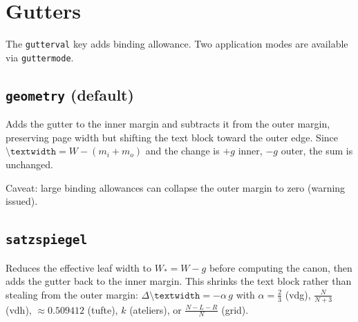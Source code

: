 \documentclass[11pt, twoside, openany]{book}
\newcommand{\cmd}[1]{\texttt{\textbackslash #1}}
\begin{document}
\chapter{Gutters}\label{chapter:gutters}

The \texttt{gutterval} key adds binding allowance. Two application modes are available via \texttt{guttermode}.

\section{\texttt{geometry} (default)}\label{sec:guttergeometry}

Adds the gutter to the inner margin and subtracts it from the outer margin, preserving page width but shifting the text block toward the outer edge. Since $\cmd{textwidth} = W - (m_i + m_o)$ and the change is $+g$ inner, $-g$ outer, the sum is unchanged.

Caveat: large binding allowances can collapse the outer margin to zero (warning issued).

\section{\texttt{satzspiegel}}\label{sec:guttersatzspiegel}

Reduces the effective leaf width to $W_\ast = W - g$ before computing the canon, then adds the gutter back to the inner margin. This shrinks the text block rather than stealing from the outer margin: $\Delta\cmd{textwidth} = -\alpha\,g$ with $\alpha = \tfrac{2}{3}$ (vdg), $\tfrac{N}{N+3}$ (vdh), $\approx 0.509412$ (tufte), $k$ (ateliers), or $\tfrac{N-L-R}{N}$ (grid).

\end{document}
